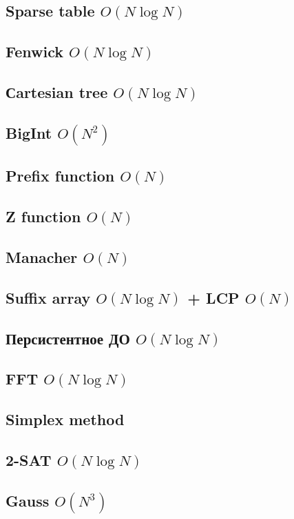 \documentclass[10pt]{article}
\begin{document}
\begin{multicols}{2}
\subsection{Sparse table $O(N\log{N})$}

\subsection{Fenwick $O(N\log{N})$}

\subsection{Сartesian tree $O(N\log{N})$}

\subsection{BigInt $O(N^2)$}

\subsection{Prefix function $O(N)$}

\subsection{Z function $O(N)$}

\subsection{Manacher $O(N)$}

\subsection{Suffix array $O(N\log{N})$ + LCP $O(N)$}

\subsection{Персистентное ДО $O(N\log{N})$}

\subsection{FFT $O(N\log{N})$}

\subsection{Simplex method}

\subsection{2-SAT $O(N\log{N})$}

\subsection{Gauss $O(N^{3})$}

\end{multicols}
\newpage
\end{document}
